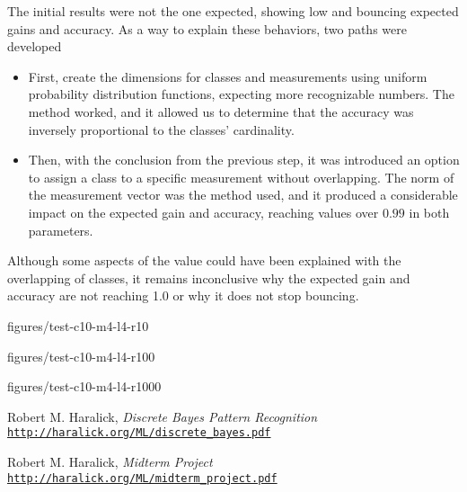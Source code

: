 \documentclass[letterpaper, conference]{IEEEtran}
\begin{document}
The initial results were not the one expected, showing low and bouncing expected gains and accuracy. As a way to explain these behaviors, two paths were developed

\begin{itemize}
  \item First, create the dimensions for classes and measurements using uniform probability distribution functions, expecting more recognizable numbers. The method worked, and it allowed us to determine that the accuracy was inversely proportional to the classes' cardinality.
  \item Then, with the conclusion from the previous step, it was introduced an option to assign a class to a specific measurement without overlapping. The norm of the measurement vector was the method used, and it produced a considerable impact on the expected gain and accuracy, reaching values over $0.99$ in both parameters.
\end{itemize}

Although some aspects of the value could have been explained with the overlapping of classes, it remains inconclusive why the expected gain and accuracy are not reaching 1.0 or why it does not stop bouncing.

figures/test-c10-m4-l4-r10


figures/test-c10-m4-l4-r100


figures/test-c10-m4-l4-r1000



\begin{thebibliography}{2}

Robert M. Haralick,
\textit{Discrete Bayes Pattern Recognition}
\\\texttt{\url{http://haralick.org/ML/discrete_bayes.pdf}}

Robert M. Haralick,
\textit{Midterm Project}
\\\texttt{\url{http://haralick.org/ML/midterm_project.pdf}}

\end{thebibliography}
\end{document}
